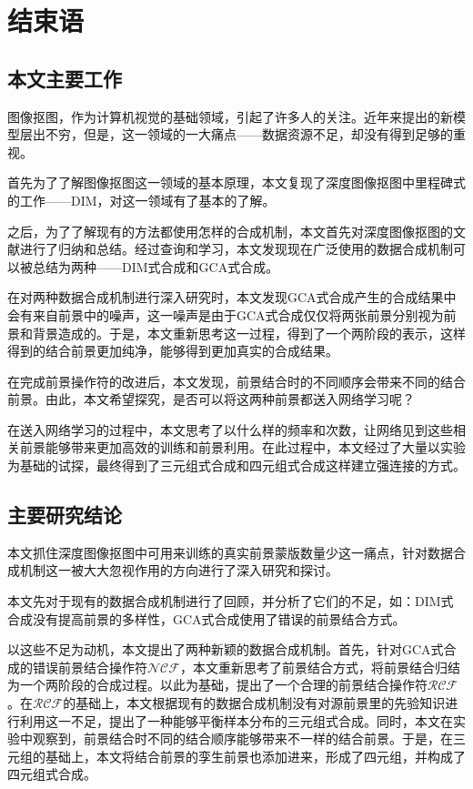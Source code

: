 \documentclass[supercite]{HustGraduPaper}
\begin{document}
	
	\section{结束语}
	\subsection{本文主要工作}%
	图像抠图，作为计算机视觉的基础领域，引起了许多人的关注。近年来提出的新模型层出不穷，但是，这一领域的一大痛点——数据资源不足，却没有得到足够的重视。
	
	首先为了了解图像抠图这一领域的基本原理，本文复现了深度图像抠图中里程碑式的工作——DIM，对这一领域有了基本的了解。

	之后，为了了解现有的方法都使用怎样的合成机制，本文首先对深度图像抠图的文献进行了归纳和总结。经过查询和学习，本文发现现在广泛使用的数据合成机制可以被总结为两种——DIM式合成和GCA式合成。

	在对两种数据合成机制进行深入研究时，本文发现GCA式合成产生的合成结果中会有来自前景中的噪声，这一噪声是由于GCA式合成仅仅将两张前景分别视为前景和背景造成的。于是，本文重新思考这一过程，得到了一个两阶段的表示，这样得到的结合前景更加纯净，能够得到更加真实的合成结果。

	在完成前景操作符的改进后，本文发现，前景结合时的不同顺序会带来不同的结合前景。由此，本文希望探究，是否可以将这两种前景都送入网络学习呢？

	在送入网络学习的过程中，本文思考了以什么样的频率和次数，让网络见到这些相关前景能够带来更加高效的训练和前景利用。在此过程中，本文经过了大量以实验为基础的试探，最终得到了三元组式合成和四元组式合成这样建立强连接的方式。
 
	\subsection{主要研究结论}%
	本文抓住深度图像抠图中可用来训练的真实前景蒙版数量少这一痛点，针对数据合成机制这一被大大忽视作用的方向进行了深入研究和探讨。
	
	本文先对于现有的数据合成机制进行了回顾，并分析了它们的不足，如：DIM式合成没有提高前景的多样性，GCA式合成使用了错误的前景结合方式。

	以这些不足为动机，本文提出了两种新颖的数据合成机制。首先，针对GCA式合成的错误前景结合操作符$\mathcal{NCF}$，本文重新思考了前景结合方式，将前景结合归结为一个两阶段的合成过程。以此为基础，提出了一个合理的前景结合操作符$\mathcal{RCF}$。在$\mathcal{RCF}$的基础上，本文根据现有的数据合成机制没有对源前景里的先验知识进行利用这一不足，提出了一种能够平衡样本分布的三元组式合成。同时，本文在实验中观察到，前景结合时不同的结合顺序能够带来不一样的结合前景。于是，在三元组的基础上，本文将结合前景的孪生前景也添加进来，形成了四元组，并构成了四元组式合成。
\end{document}
